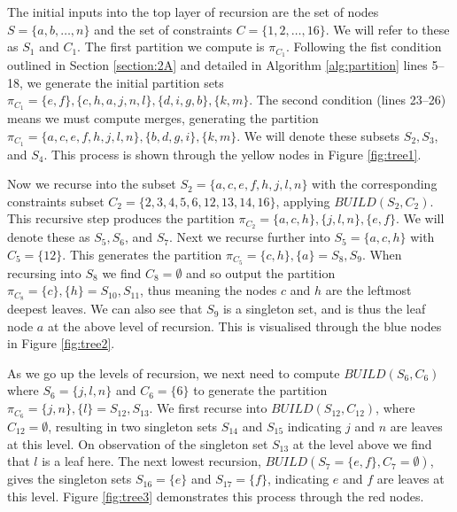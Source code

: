 \documentclass[a4paper, 11pt]{article}
\begin{document}
	The initial inputs into the top layer of recursion are the set of nodes $S = \{a, b, \ldots, n\}$ and the set of constraints $C = \{1, 2, \ldots, 16\}$. We will refer to these as $S_{1}$ and $C_{1}$. The first partition we compute is $\pi_{C_{1}}$. Following the fist condition outlined in Section \ref{section:2A} and detailed in Algorithm \ref{alg:partition} lines 5--18, we generate the initial partition sets $\pi_{C_{1}} = \{e, f\}, \{c, h, a, j, n, l\}, \{d, i, g, b\}, \{k, m\}$. The second condition (lines 23--26) means we must compute merges, generating the partition $\pi_{C_{1}} = \{a, c, e, f, h, j, l, n\}, \{b, d, g, i\}, \{k, m\}$. We will denote these subsets $S_{2}, S_{3}$, and $S_{4}$. This process is shown through the yellow nodes in Figure \ref{fig:tree1}.
	
	Now we recurse into the subset $S_{2} = \{a, c, e, f, h, j, l, n\}$ with the corresponding constraints subset $C_{2} = \{2, 3, 4, 5, 6, 12, 13, 14, 16\}$, applying $BUILD(S_{2}, C_{2})$. This recursive step produces the partition $\pi_{C_{2}} = \{a, c, h\}, \{j, l, n\}, \{e, f\}$. We will denote these as $S_{5}, S_{6}$, and $S_{7}$. Next we recurse further into $S_{5} = \{a, c, h\}$ with $C_{5} = \{12\}$. This generates the partition $\pi_{C_{5}} = \{c, h\}, \{a\} = S_{8}, S_{9}$. When recursing into $S_{8}$ we find $C_{8} = \emptyset$ and so output the partition $\pi_{C_{8}} = \{c\}, \{h\} = S_{10}, S_{11}$, thus meaning the nodes $c$ and $h$ are the leftmost deepest leaves. We can also see that $S_{9}$ is a singleton set, and is thus the leaf node $a$ at the above level of recursion. This is visualised through the blue nodes in Figure \ref{fig:tree2}.
	
	As we go up the levels of recursion, we next need to compute $BUILD(S_{6}, C_{6})$ where $S_{6} = \{j, l, n\}$ and $C_{6} = \{6\}$ to generate the partition $\pi_{C_{6}} = \{j, n\}, \{l\} = S_{12}, S_{13}$. We first recurse into $BUILD(S_{12}, C_{12})$, where $C_{12} = \emptyset$, resulting in two singleton sets $S_{14}$ and $S_{15}$ indicating $j$ and $n$ are leaves at this level. On observation of the singleton set $S_{13}$ at the level above we find that $l$ is a leaf here. The next lowest recursion, $BUILD(S_{7} = \{e, f\}, C_{7} = \emptyset)$, gives the singleton sets $S_{16} = \{e\}$ and $S_{17} = \{f\}$, indicating $e$ and $f$ are leaves at this level. Figure \ref{fig:tree3} demonstrates this process through the red nodes.
	
\end{document}
